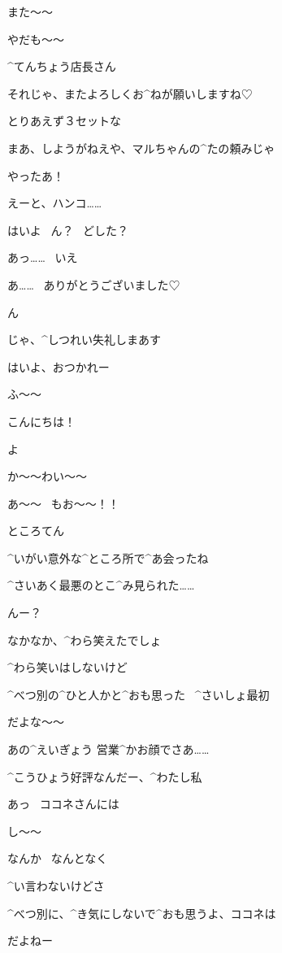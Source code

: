 \page[103]
\Maruko また〜〜

\Maruko やだも〜〜

\Maruko ^{てんちょう}{店長}さん

\Maruko それじゃ、またよろしくお^{ねが}{願}いしますね♡

\Person とりあえず３セットな

\Person まあ、しようがねえや、マルちゃんの^{たの}{頼}みじゃ

\Maruko やったあ！

\page[104]
\Person えーと、ハンコ……

\Person はいよ
\ ん？
\ どした？

\Maruko あっ……
\ いえ

\page[105]
\Maruko あ……
\ ありがとうございました♡

\Person ん

\Maruko じゃ、^{しつれい}{失礼}しまあす

\Person はいよ、おつかれー

\page[106]
\Maruko ふ〜〜

\Alpha こんにちは！

\Maruko よ

\Alpha か〜〜わい〜〜

\Maruko あ〜〜
\ もお〜〜！！

\page[107]
\Sign ところてん

\Alpha ^{いがい}{意外}な^{ところ}{所}で^{あ}{会}ったね

\Maruko ^{さいあく}{最悪}のとこ^{み}{見}られた……

\Alpha んー？

\Maruko なかなか、^{わら}{笑}えたでしょ

\Alpha ^{わら}{笑}いはしないけど

\page[108]
\Alpha ^{べつ}{別}の^{ひと}{人}かと^{おも}{思}った
\ ^{さいしょ}{最初}

\Maruko だよな〜〜

\Maruko あの^{えいぎょう }{営業}^{かお}{顔}でさあ……

\Maruko ^{こうひょう}{好評}なんだー、^{わたし}{私}

\page[109]
\Maruko あっ
\ ココネさんには

\Maruko し〜〜

\Maruko なんか
\ なんとなく

\Alpha ^{い}{言}わないけどさ

\Alpha ^{べつ}{別}に、^{き}{気}にしないで^{おも}{思}うよ、ココネは

\Maruko だよねー

